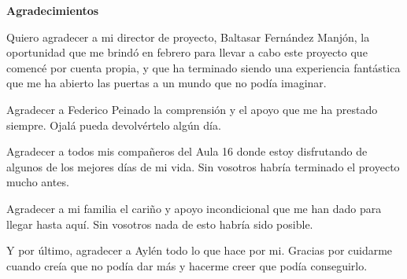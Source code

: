 
\newpage
\begin{center}
{\bf \Huge Agradecimientos}
\end{center}
\vspace{1cm}
\setlength{\baselineskip}{0.8cm}

Quiero agradecer a mi director de proyecto, Baltasar Fernández Manjón, la oportunidad que me brindó en febrero para llevar a cabo este proyecto que comencé por cuenta propia, y que ha terminado siendo una experiencia fantástica que me ha abierto las puertas a un mundo que no podía imaginar.

Agradecer a Federico Peinado la comprensión y el apoyo que me ha prestado siempre. Ojalá pueda devolvértelo algún día.

Agradecer a todos mis compañeros del Aula 16 donde estoy disfrutando de algunos de los mejores días de mi vida. Sin vosotros habría terminado el proyecto mucho antes.

Agradecer a mi familia el cariño y apoyo incondicional que me han dado para llegar hasta aquí. Sin vosotros nada de esto habría sido posible.

Y por último, agradecer a Aylén todo lo que hace por mi. Gracias por cuidarme cuando creía que no podía dar más y hacerme creer que podía conseguirlo.
